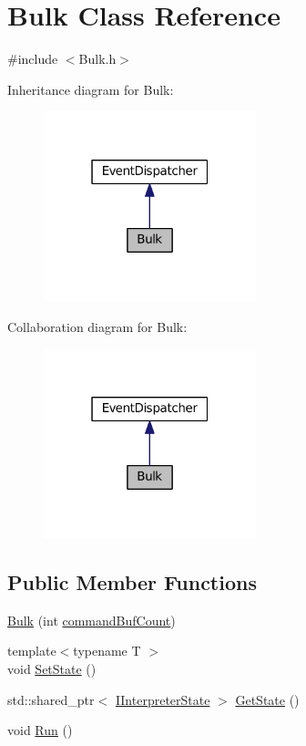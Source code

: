 \hypertarget{class_bulk}{}\section{Bulk Class Reference}
\label{class_bulk}


{\ttfamily \#include $<$Bulk.\+h$>$}



Inheritance diagram for Bulk\+:
\nopagebreak
\begin{figure}[H]
\begin{center}
\leavevmode
\includegraphics[width=175pt]{class_bulk__inherit__graph}
\end{center}
\end{figure}


Collaboration diagram for Bulk\+:
\nopagebreak
\begin{figure}[H]
\begin{center}
\leavevmode
\includegraphics[width=175pt]{class_bulk__coll__graph}
\end{center}
\end{figure}
\subsection*{Public Member Functions}
\begin{DoxyCompactItemize}
\item 
\hyperlink{class_bulk_a3cb233a46de98d8111b7ae7606ba1460}{Bulk} (int \hyperlink{class_bulk_ac4c14e391ab0654fc1a2b6aea0b77410}{command\+Buf\+Count})
\item 
{\footnotesize template$<$typename T $>$ }\\void \hyperlink{class_bulk_ab420aeb70efbd54b1a7975c18da12c8f}{Set\+State} ()
\item 
std\+::shared\+\_\+ptr$<$ \hyperlink{class_i_interpreter_state}{I\+Interpreter\+State} $>$ \hyperlink{class_bulk_aa210e457c6f020835bde3bb67e0cfce3}{Get\+State} ()
\item 
void \hyperlink{class_bulk_a1be5c7493701769d6f95f1b37d94b752}{Run} ()
\end{DoxyCompactItemize}

